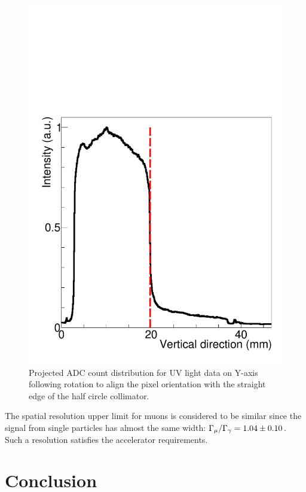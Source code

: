 \documentclass[preprint,3p,twocolumn]{elsarticle}
\begin{document}
\begin{figure}[tbp]
    \centering
	\includegraphics[width=\columnwidth]{figure/edge_image_w_uv_4_BH_axis.pdf}
	\caption{Projected ADC count distribution for UV light
          data on Y-axis following rotation to align the pixel
          orientation with the straight edge of the half circle
          collimator.}
	\label{fig:half_circle}
\end{figure}

The spatial resolution upper limit for muons is considered to be
similar since the signal from single particles has almost
the same width:
$\Gamma_{\mu} / \Gamma_{\gamma} = \num{1.04 \pm 0.10}$.  Such a
resolution satisfies the accelerator requirements.

\section{Conclusion}
\end{document}

